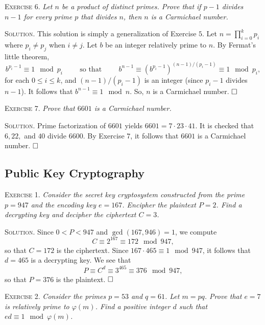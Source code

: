 \documentclass[11pt, leqno]{article}
\newcommand{\done}{\ensuremath{\hfill\square}}
\begin{document}
\textsc{Exercise 6}. \emph{Let $n$ be a product of distinct primes. Prove that if $p-1$ divides $n-1$ for every prime $p$ that divides $n$, then $n$ is a Carmichael number.}

\textsc{Solution}. This solution is simply a generalization of Exercise $5$. Let $n = \prod_{i=0}^k p_i$ where $p_i \ne p_j$ when $i \ne j$. Let $b$ be an integer relatively prime to $n$. By Fermat's little theorem, 
\begin{displaymath}
b^{p_i-1} \equiv 1 \mod p_i \hspace{1cm} \text{so that} \hspace{1cm} b^{n-1} \equiv (b^{p_i-1})^{(n-1)/(p_i-1)} \equiv 1 \mod p_i,
\end{displaymath}
for each $0\leq i \leq k$, and $(n-1)/(p_i-1)$ is an integer (since $p_i-1$ divides $n-1$). It follows that $b^{n-1} \equiv 1 \mod n$. So, $n$ is a Carmichael number. \done

\textsc{Exercise 7}. \emph{Prove that $6601$ is a Carmichael number.}

\textsc{Solution}. Prime factorization of $6601$ yields $6601 = 7 \cdot 23 \cdot 41$. It is checked that $6, 22,$ and $40$ divide $6600$. By Exercise $7$, it follows that $6601$ is a Carmichael number. \done

\subsection{Public Key Cryptography}

\textsc{Exercise 1}. \emph{Consider the secret key cryptosystem constructed from the prime $p = 947$ and the encoding key $e = 167$. Encipher the plaintext $P=2$. Find a decrypting key and decipher the ciphertext $C=3$.}

\textsc{Solution}. Since $0< P < 947$ and $\gcd(167, 946) = 1$, we compute
\begin{displaymath}
C \equiv 2^{167} \equiv 172 \mod 947,
\end{displaymath}
so that $C = 172$ is the ciphertext. Since $167\cdot 465 \equiv 1 \mod 947$, it follows that $d=465$ is a decrypting key. We see that 
\begin{displaymath}
P \equiv C^d \equiv 3^{465} \equiv 376 \mod 947,
\end{displaymath}
so that $P = 376$ is the plaintext. \done

\textsc{Exercise 2}. \emph{Consider the primes $p=53$ and $q=61$. Let $m = pq$. Prove that $e=7$ is relatively prime to $\varphi(m)$. Find a positive integer $d$ such that $ed \equiv 1 \mod \varphi(m)$.}
\end{document}
